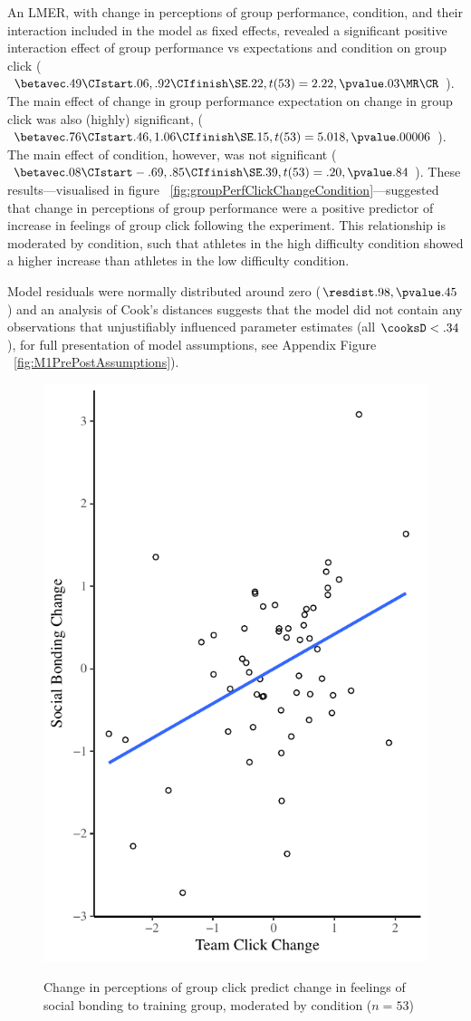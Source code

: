 An LMER, with change in perceptions of group performance, condition, and their interaction included in the model as fixed effects, revealed a significant positive interaction effect of group performance vs expectations and condition on group click
($\betavec .49 \CIstart .06, .92 \CIfinish \SE .22, t(53) = 2.22, \pvalue .03 \MR \CR $).
The main effect of change in group performance expectation on change in group click was also (highly) significant, ($\betavec .76 \CIstart .46, 1.06 \CIfinish \SE .15, t(53) = 5.018, \pvalue .00006 $). The main effect of condition, however, was not significant ($\betavec .08 \CIstart -.69, .85 \CIfinish \SE .39, t(53) = .20, \pvalue .84 $).
These results---visualised in figure ~\ref{fig:groupPerfClickChangeCondition}---suggested that change in perceptions of group performance were a positive predictor of increase in feelings of group click following the experiment.  This relationship is moderated by condition, such that athletes in the high difficulty condition showed a higher increase than athletes in the low difficulty condition.

Model residuals were normally distributed around zero ($\resdist .98, \pvalue .45$) and an analysis of Cook's distances suggests that the model did not contain any observations that unjustifiably influenced parameter estimates (all $\cooksD < .34$), for full presentation of model assumptions, see Appendix Figure ~\ref{fig:M1PrePostAssumptions}).






\begin{figure}
  \centering
    \includegraphics[width=0.5\linewidth,keepaspectratio] {images/groupClickBondingChangeCondition}
    \label{fig:groupClickBondingChangeCondition}
    \caption{Change in perceptions of group click predict change in feelings of social bonding to training group, moderated by condition ($n = 53$)}
\end{figure}

